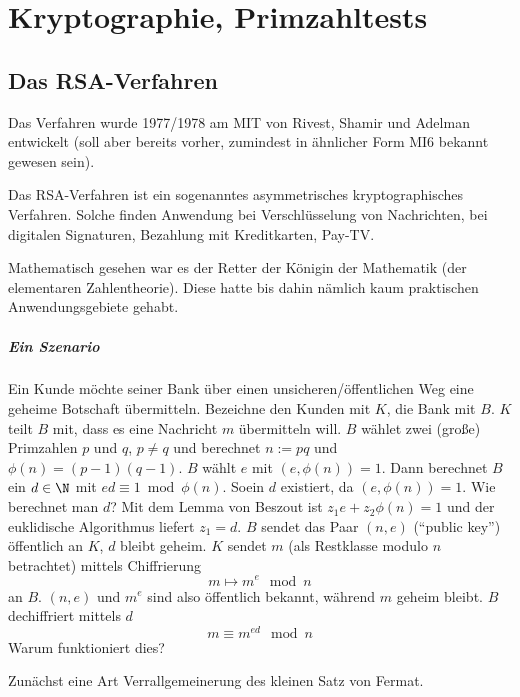 \chapter{Kryptographie, Primzahltests}



\section{Das RSA-Verfahren}

Das Verfahren wurde 1977/1978 am MIT von Rivest, Shamir und Adelman entwickelt (soll aber bereits vorher, zumindest in ähnlicher Form MI6 bekannt gewesen sein).

Das RSA-Verfahren ist ein sogenanntes asymmetrisches kryptographisches Verfahren.
Solche finden Anwendung bei Verschlüsselung von Nachrichten, bei digitalen Signaturen, Bezahlung mit Kreditkarten, Pay-TV.

Mathematisch gesehen war es der Retter der Königin der Mathematik (der elementaren Zahlentheorie).
Diese hatte bis dahin nämlich kaum praktischen Anwendungsgebiete gehabt.


\paragraph{Ein Szenario}
Ein Kunde möchte seiner Bank über einen unsicheren/öffentlichen Weg eine geheime Botschaft übermitteln.
Bezeichne den Kunden mit $K$, die Bank mit $B$.
$K$ teilt $B$ mit, dass es eine Nachricht $m$ übermitteln will.
$B$ wählet zwei (große) Primzahlen $p$ und $q$, $p \neq q$ und berechnet $n := pq$ und $\phi(n) = (p-1)(q-1)$.
$B$ wählt $e$ mit $(e, \phi(n)) = 1$.
Dann berechnet $B$ ein $d \in \N$ mit $ed \equiv 1 \bmod \phi(n)$.
Soein $d$ existiert, da $(e, \phi(n)) = 1$.
Wie berechnet man $d$?
Mit dem Lemma von Beszout ist $z_1 e + z_2 \phi(n) = 1$ und der euklidische Algorithmus liefert $z_1 = d$.
$B$ sendet das Paar $(n, e)$ (“public key”) öffentlich an $K$, $d$ bleibt geheim.
$K$ sendet $m$ (als Restklasse modulo $n$ betrachtet) mittels Chiffrierung
\[
	m \mapsto m^e \mod n
\]
an $B$.
$(n, e)$ und $m^e$ sind also öffentlich bekannt, während $m$ geheim bleibt.
$B$ dechiffriert mittels $d$
\[
	m \equiv m^{ed} \mod n
\]
Warum funktioniert dies?


Zunächst eine Art Verrallgemeinerung des kleinen Satz von Fermat.

